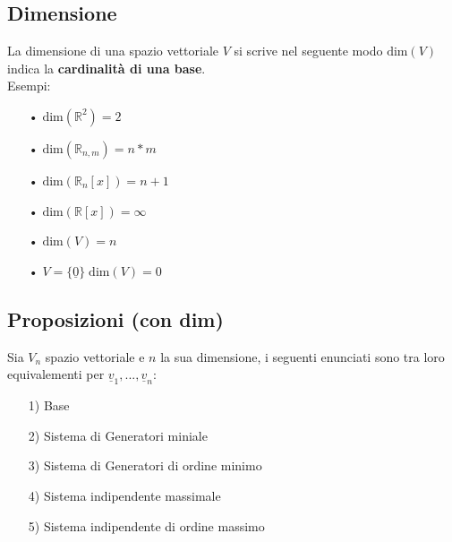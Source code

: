 \subsection{Dimensione}
La dimensione di una spazio vettoriale $V$ si scrive nel seguente modo $\text{dim}(V)$ indica la \textbf{cardinalità di una base}.\\
Esempi:
\begin{itemize}
\item[• ] $\text{dim}(\mathbb{R}^2) = 2$
\item[• ] $\text{dim}(\mathbb{R}_{n,m}) = n*m$
\item[• ] $\text{dim}(\mathbb{R}_n[x]) = n+1$
\item[• ] $\text{dim}(\mathbb{R}[x]) = \infty$
\item[• ] $\text{dim}(V) = n$
\item[• ] $V=\{\underline{0}\} \; \text{dim}(V) = 0$
\end{itemize}

\subsection{Proposizioni (con dim)}
Sia $V_n$ spazio vettoriale e $n$ la sua dimensione, i seguenti enunciati sono tra loro equivalementi per $\underline{v}_1,...,\underline{v}_n$:
\begin{itemize}
\item[1)] Base
\item[2)] Sistema di Generatori miniale
\item[3)] Sistema di Generatori di ordine minimo
\item[4)] Sistema indipendente massimale
\item[5)] Sistema indipendente di ordine massimo
\end{itemize}



